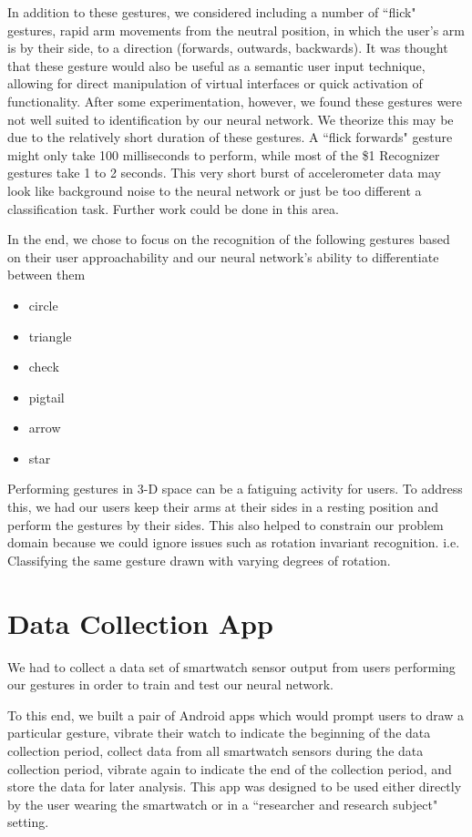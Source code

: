 \documentclass{report}
\begin{document}
In addition to these gestures, we considered including a number of ``flick" gestures, rapid arm movements from the neutral position, in which the user's arm is by their side, to a direction (forwards, outwards, backwards). It was thought that these gesture would also be useful as a semantic user input technique, allowing for direct manipulation of virtual interfaces or quick activation of functionality. After some experimentation, however, we found these gestures were not well suited to identification by our neural network. We theorize this may be due to the relatively short duration of these gestures. A ``flick forwards" gesture might only take 100 milliseconds to perform, while most of the \$1 Recognizer gestures take 1 to 2 seconds. This very short burst of accelerometer data may look like background noise to the neural network or just be too different a classification task. Further work could be done in this area.

In the end, we chose to focus on the recognition of the following gestures based on their user approachability and our neural network's ability to differentiate between them
\begin{itemize}
\item circle
\item triangle
\item check
\item pigtail
\item arrow
\item star
\end{itemize}

Performing gestures in 3-D space can be a fatiguing activity for users. To address this, we had our users keep their arms at their sides in a resting position and perform the gestures by their sides. This also helped to constrain our problem domain because we could ignore issues such as rotation invariant recognition. i.e. Classifying the same gesture drawn with varying degrees of rotation.

\section{Data Collection App}

We had to collect a data set of smartwatch sensor output from users performing our gestures in order to train and test our neural network.

To this end, we built a pair of Android apps which would prompt users to draw a particular gesture, vibrate their watch to indicate the beginning of the data collection period, collect data from all smartwatch sensors during the data collection period, vibrate again to indicate the end of the collection period, and store the data for later analysis. This app was designed to be used either directly by the user wearing the smartwatch or in a ``researcher and research subject" setting.
\end{document}
